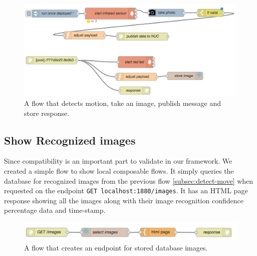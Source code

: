 \begin{figure}[H]
	\centering
	\includegraphics[scale=0.6]{images/flow-motion.png}
	\caption{A flow that detects motion, take an image, publish message and store response.}
	\label{fig:flow-motion}
\end{figure}


\subsection{Show Recognized images}
Since compatibility is an important part to validate in our framework. We created a simple flow to show local composable flows. It simply queries the database for recognized images from the previous flow \ref{subsec:detect-move} when requested on the endpoint \verb|GET localhost:1880/images|. It has an HTML page response showing all the images along with their image recognition confidence percentage data and time-stamp.

\begin{figure}[H]
	\centering
	\includegraphics[scale=0.6]{images/flow-images.png}
	\caption{A flow that creates an endpoint for stored database images.}
	\label{fig:flow-image}
\end{figure}

